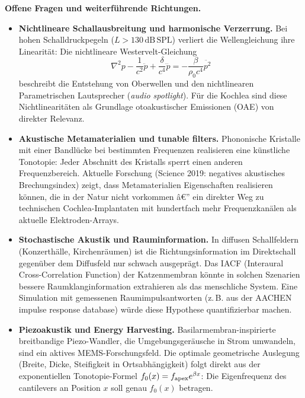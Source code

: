 ﻿\documentclass[12pt,a4paper,titlepage]{report}
\begin{document}
\textbf{Offene Fragen und weiterführende Richtungen.}
\begin{itemize}[leftmargin=2em]
  \item \textbf{Nichtlineare Schallausbreitung und harmonische Verzerrung.}
    Bei hohen Schalldruckpegeln ($L > 130\,\mathrm{dB}\,\mathrm{SPL}$)
    verliert die Wellengleichung ihre Linearität:
    Die nichtlineare Westervelt-Gleichung
    \[
      \nabla^2 p - \frac{1}{c^2}\ddot{p}
      + \frac{\delta}{c^4}\dddot{p}
      = -\frac{\beta}{\rho_0 c^4}\ddot{p^2}
    \]
    beschreibt die Entstehung von Oberwellen und den nichtlinearen
    Parametrischen Lautsprecher (\emph{audio spotlight}).
    Für die Kochlea sind diese Nichtlinearitäten als Grundlage
    otoakustischer Emissionen (OAE) von direkter Relevanz.
  \item \textbf{Akustische Metamaterialien und tunable filters.}
    Phononische Kristalle mit einer Bandlücke bei bestimmten
    Frequenzen realisieren eine künstliche Tonotopie:
    Jeder Abschnitt des Kristalls sperrt einen anderen
    Frequenzbereich.
    Aktuelle Forschung (Science 2019: negatives akustisches Brechungsindex)
    zeigt, dass Metamaterialien Eigenschaften realisieren können,
    die in der Natur nicht vorkommen â€”
    ein direkter Weg zu technischen Cochlea-Implantaten
    mit hundertfach mehr Frequenzkanälen als aktuelle Elektroden-Arrays.
  \item \textbf{Stochastische Akustik und Rauminformation.}
    In diffusen Schallfeldern (Konzerthälle, Kirchenräumen) ist
    die Richtungsinformation im Direktschall gegenüber dem
    Diffusfeld nur schwach ausgeprägt.
    Das IACF (Interaural Cross-Correlation Function) der
    Katzenmembran könnte in solchen Szenarien bessere
    Raumklanginformation extrahieren als das menschliche System.
    Eine Simulation mit gemessenen Raumimpulsantworten
    (z.\,B. aus der AACHEN impulse response database)
    würde diese Hypothese quantifizierbar machen.
  \item \textbf{Piezoakustik und Energy Harvesting.}
    Basilarmembran-inspirierte breitbandige Piezo-Wandler,
    die Umgebungsgeräusche in Strom umwandeln, sind ein
    aktives MEMS-Forschungsfeld.
    Die optimale geometrische Auslegung (Breite, Dicke, Steifigkeit
    in Ortsabhängigkeit)  folgt direkt aus der exponentiellen
    Tonotopie-Formel $f_0(x) = f_{\rm apex} e^{\beta x}$:
    Die Eigenfrequenz des cantilevers an Position $x$
    soll genau $f_0(x)$ betragen.
\end{itemize}
\end{document}
